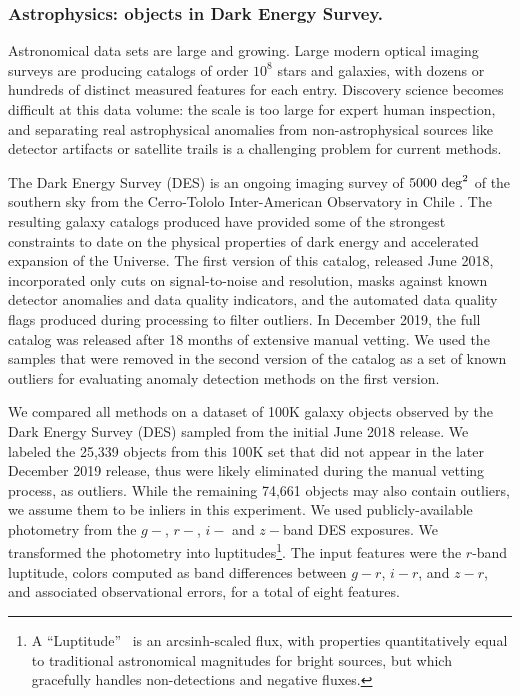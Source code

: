 \documentclass[letterpaper]{article} %
\begin{document}
\subsubsection{Astrophysics: objects in Dark Energy Survey.}
Astronomical data sets are large and growing. Large modern optical
imaging surveys are producing catalogs of order $10^8$ stars
and galaxies, with dozens or hundreds of distinct measured features
for each entry. Discovery science becomes difficult at this data
volume: the scale is too large for expert human inspection, and separating real
astrophysical anomalies from non-astrophysical sources like detector artifacts or
satellite trails is a challenging problem for current methods.

The Dark Energy Survey (DES) is an ongoing imaging survey of
$5000~{\rm deg}^2$ of the southern sky from the Cerro-Tololo
Inter-American Observatory in Chile \cite{DESY1}. The resulting galaxy catalogs produced have provided some of the strongest constraints to date on
the physical properties of dark energy and accelerated expansion
of the Universe. The first version of this catalog, released June 2018, incorporated
only cuts on signal-to-noise and resolution, masks against known detector
anomalies and data quality indicators, and the automated data quality
flags produced during processing to filter outliers. 
In December 2019, the full catalog
was released after 18 months of extensive manual vetting. We used the samples 
that were removed in the second version of the catalog as a set of known
outliers for evaluating anomaly detection methods on the first version.

We compared all methods on a dataset of 100K galaxy objects
observed by the Dark Energy Survey (DES) sampled from the initial June 2018 release.
We labeled the 25,339 objects from this 100K set that did not appear in the later December 2019
release, thus were likely eliminated during the manual vetting process, 
as outliers.
While the remaining 74,661 objects may also contain outliers, we assume them to be inliers in this experiment. We used publicly-available photometry from the $g-$, $r-$, $i-$ and $z-$band DES exposures.  We
transformed the photometry into luptitudes\footnote{A
  ``Luptitude''~\cite{lupton99} is an arcsinh-scaled flux, with
  properties quantitatively equal to
  traditional astronomical magnitudes for bright sources, but which
  gracefully handles non-detections and negative fluxes.}.  The input features 
  were the $r$-band luptitude, colors computed as band differences between
$g-r$, $i-r$, and $z-r$, and associated observational errors, for a total of eight features.
%
\end{document}
